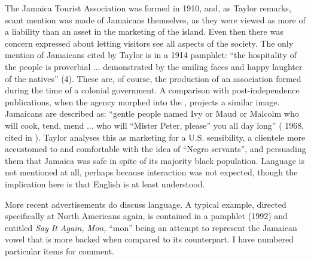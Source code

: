 The Jamaica Tourist Association was formed in 1910, and, as Taylor remarks, scant mention was made of Jamaicans themselves, as they were viewed as more of a liability than an asset in the marketing of the island.  Even then there was concern expressed about letting visitors see all aspects of the society.  The only mention of Jamaicans cited by Taylor is in a 1914 pamphlet: “the hospitality of the people is proverbial ... demonstrated by the smiling faces and happy laughter of the natives” (4).  These are, of course, the production of an association formed during the time of a colonial government.  A comparison with post-independence publications, when the agency morphed into the , projects a similar image.  Jamaicans are described as: “gentle people named Ivy or Maud or Malcolm who will cook, tend, mend ... who will “Mister Peter, please” you all day long” ( 1968, cited in \citealt[174]{Taylor1993}).  Taylor analyses this as marketing for a U.S. sensibility, a clientele more accustomed to and comfortable with the idea of “Negro servants”, and persuading them that Jamaica was safe in spite of its majority black population.  Language is not mentioned at all, perhaps because interaction was not expected, though the implication here is that English is at least understood.

More recent advertisements do discuss language.  A typical example, directed specifically at North Americans again, is contained in a  pamphlet (1992) and entitled \textit{Say It Again, Mon,} “mon” being an attempt to represent the Jamaican vowel that is more backed when compared to its  counterpart.  I have numbered particular items for comment.

